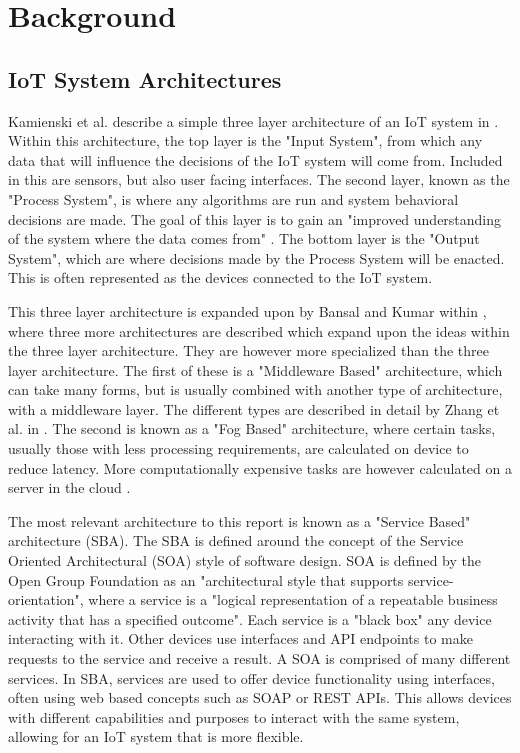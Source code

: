 \chapter{Background} \label{cha:chapter2}

\section{IoT System Architectures} \label{sec:chap2:servers}
Kamienski et al. describe a simple three layer architecture of an IoT system in
\cite{DesigningOpenIotSystem}. Within this architecture, the top layer is the 
"Input System", from which any data that will influence the decisions of the 
IoT system will come from. Included in this are sensors, but also user facing 
interfaces. The second layer, known as the "Process System", is where any 
algorithms are run and system behavioral decisions are made. The goal of this 
layer is to gain an "improved understanding of the system where the  data comes 
from" \cite{DesigningOpenIotSystem}. The bottom layer is the "Output System", 
which are where decisions made by the Process System will be enacted. This is 
often represented as the devices connected to the IoT system.

This three layer architecture is expanded upon by Bansal and Kumar within 
\cite{IotEcosystemSurvey}, where three more architectures are described which 
expand upon the ideas within the three layer architecture. They are however more 
specialized than the three layer architecture. The first of these is a 
"Middleware Based" architecture, which can take many forms, but is usually 
combined with another type of architecture, with a middleware layer. The 
different types are described in detail by Zhang et al. in 
\cite{MiddlewareIOTSurvey}. The second is known as a "Fog Based" architecture, 
where certain tasks, usually those with less processing requirements, are 
calculated on device to reduce latency. More computationally expensive tasks are 
however calculated on a server in the cloud \cite{IoTArchitectures}.

The most relevant architecture to this report is known as a "Service Based" 
architecture (SBA). The SBA is defined around the concept of the Service 
Oriented Architectural (SOA) style\cite{InteractingSoaBasedIot} of software 
design. SOA is defined by the Open Group Foundation as an "architectural style 
that supports service-orientation", where a service is a "logical representation 
of a repeatable business activity that has a specified 
outcome"\cite{SoaSourceBook}. Each service is a "black box" any device 
interacting with it. Other devices use interfaces and API endpoints to make 
requests to the service and receive a result. A SOA is comprised of many 
different services. In SBA, services are used to offer device functionality 
using interfaces, often using web based concepts such as SOAP or REST 
APIs\cite{TrustManagementSoaIot}. This allows devices with different 
capabilities and purposes to interact with the same system, allowing for an IoT 
system that is more flexible.

